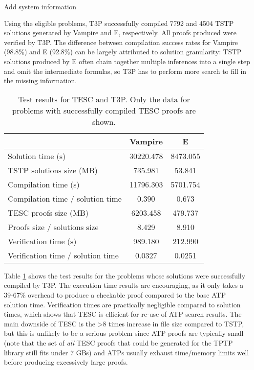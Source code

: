 \documentclass[12pt]{article}
\begin{document}
Add system information

Using the eligible problems, T3P successfully compiled 7792 and 4504 TSTP solutions 
generated by Vampire and E, respectively. All proofs produced were verified by T3P.
The difference between compilation success rates for Vampire (98.8\%) and E (92.8\%) 
can be largely attributed to solution granularity: TSTP solutions produced by E often 
chain together multiple inferences into a single step and omit the intermediate formulas, 
so T3P has to perform more search to fill in the missing information. 

\begin{table}[]
  \centering
  \begin{tabular}{l|cc}
                                    & Vampire   & E        \\ \hline
  Solution time (s)                 & 30220.478 & 8473.055 \\ 
  TSTP solutions size (MB)          & 735.981   & 53.841   \\
  Compilation time (s)              & 11796.303 & 5701.754 \\
  Compilation time / solution time  & 0.390     & 0.673    \\
  TESC proofs size (MB)             & 6203.458  & 479.737  \\
  Proofs size / solutions size      & 8.429     & 8.910    \\
  Verification time (s)             & 989.180   & 212.990  \\
  Verification time / solution time & 0.0327    & 0.0251  
  \end{tabular}
  \caption{Test results for TESC and T3P. Only the data for problems with successfully compiled TESC proofs are shown.}
  \label{tab:results}
\end{table}

Table \ref{tab:results} shows the test results for the problems whose solutions
were successfully compiled by T3P. The execution time results are 
encouraging, as it only takes a 39-67\% overhead to produce a checkable proof compared to the base
ATP solution time. Verification times are practically negligible compared to solution times, which
shows that TESC is efficient for re-use of ATP search results. The main downside of TESC is the 
>8 times increase in file size compared to TSTP, but this is unlikely to be a serious problem 
since ATP proofs are typically small (note that the set of \textit{all} TESC proofs that could be 
generated for the TPTP library still fits under 7 GBs) and ATPs usually exhaust
time/memory limits well before producing excessively large proofs.
\end{document}
